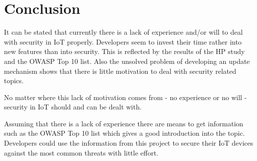\documentclass[conference]{IEEEtran}
\begin{document}
%





\section{Conclusion}
It can be stated that currently there is a lack of experience and/or will to 
deal with security in IoT properly. Developers seem to invest their time rather 
into new features than into security. This is reflected by the results of the 
HP study and the OWASP Top 10 list. Also the unsolved problem of developing an 
update mechanism shows that there is little motivation to deal with security 
related topics.

No matter where this lack of motivation comes from - no experience or no will - 
security in IoT should and can be dealt with.

Assuming that there is a lack of experience there are means to get information 
such as the OWASP Top 10 list which gives a good introduction into the topic. 
Developers could use the information from this project to secure their IoT 
devices against the most common threats with little effort.
\end{document}
